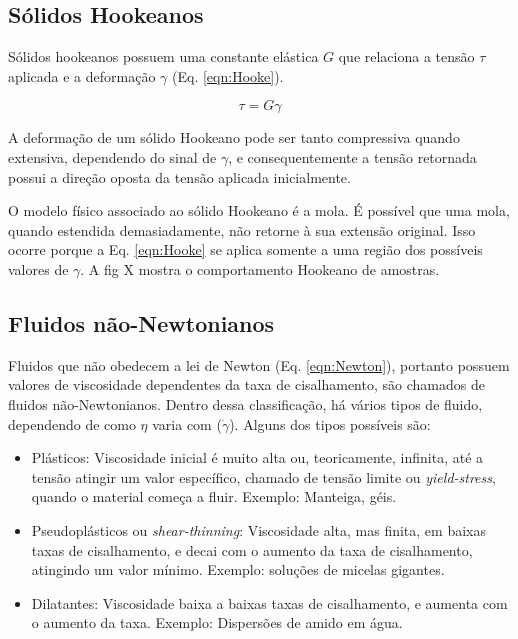 			\subsection{Sólidos Hookeanos}
			
			Sólidos hookeanos possuem uma constante elástica \(G\) que relaciona a tensão \(\tau\) aplicada e a deformação \(\gamma\) (Eq. \ref{eqn:Hooke}).
			
			\begin{equation}
				\tau = G\gamma
				\label{eqn:Hooke}
			\end{equation}
			
			A deformação de um sólido Hookeano pode ser tanto compressiva quando extensiva, dependendo do sinal de \(\gamma\), e consequentemente a tensão retornada possui a direção oposta da tensão aplicada inicialmente. 
			
			O modelo físico associado ao sólido Hookeano é a mola. É possível que uma mola, quando estendida demasiadamente, não retorne à sua extensão original. Isso ocorre porque a Eq. \ref{eqn:Hooke} se aplica somente a uma região dos possíveis valores de \(\gamma\). A fig X mostra o comportamento Hookeano de amostras.
			
			
			\subsection{Fluidos não-Newtonianos}
			\label{sec:teoria_fluidos_NN}
			Fluidos que não obedecem a lei de Newton (Eq. \ref{eqn:Newton}), portanto possuem valores de viscosidade dependentes da taxa de cisalhamento, são chamados de fluidos não-Newtonianos. Dentro dessa classificação, há vários tipos de fluido, dependendo de como \(\eta\) varia com (\(\dot{\gamma}\)). Alguns dos tipos possíveis são:
			
			\begin{itemize}[noitemsep]
				\item Plásticos: Viscosidade inicial é muito alta ou, teoricamente, infinita, até a tensão atingir um valor específico, chamado de tensão limite ou \emph{yield-stress}, quando o material começa a fluir. Exemplo: Manteiga, géis. %
				\item Pseudoplásticos ou \emph{shear-thinning}: Viscosidade alta, mas finita, em baixas taxas de cisalhamento, e decai com o aumento da taxa de cisalhamento, atingindo um valor mínimo. Exemplo: soluções de micelas gigantes.
				\item Dilatantes: Viscosidade baixa a baixas taxas de cisalhamento, e aumenta com o aumento da taxa. Exemplo: Dispersões de amido em água.
			\end{itemize}
			
